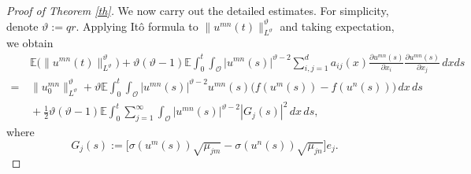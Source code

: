 \documentclass[10pt]{article}
\numberwithin{figure}{section}
\numberwithin{equation}{section}
\newcommand{\0}{{\theta}}
\begin{document}
\begin{proof}[Proof of Theorem \ref{th}]
We now carry out the detailed estimates. For simplicity, denote $\vartheta:=qr$. Applying It\^o formula to $\|u^{mn}(t)\|_{L^\vartheta}^\vartheta$ and taking expectation, we obtain  
\begin{equation}\label{eq4.29}
\begin{split}
&\,\mathbb{E}\big(\|u^{mn}(t)\|_{L^\vartheta}^\vartheta\big) +\vartheta(\vartheta-1) \mathbb{E}\int_0^t \int_{\mathcal{O}} |u^{mn}(s)|^{\vartheta-2} \sum_{i,j=1}^d a_{ij}(x) \frac{\partial u^{mn}(s)}{\partial x_i} \frac{\partial u^{mn}(s)}{\partial x_j} \, dx ds\\
= &\, \|u^{mn}_0\|_{L^\vartheta}^\vartheta
+ \vartheta \mathbb{E}\int_0^t \int_{\mathcal{O}} |u^{mn}(s)|^{\vartheta-2} u^{mn}(s) \big( f(u^m(s)) - f(u^n(s)) \big) \, dx \, ds \\
&\, + \frac12 {\vartheta}({\vartheta}-1) \mathbb{E}\int_0^t\sum_{j=1}^\infty \int_{\mathcal{O}} |u^{mn}(s)|^{\vartheta-2} |G_j(s)|^2 \, dx \, ds,
\end{split}
\end{equation}
where 
$$
G_j(s) := \big[ \sigma(u^m(s))\sqrt{\mu_{jm}} - \sigma(u^n(s))\sqrt{\mu_{jn}} \big] e_j.
$$


\end{proof}
\end{document}
